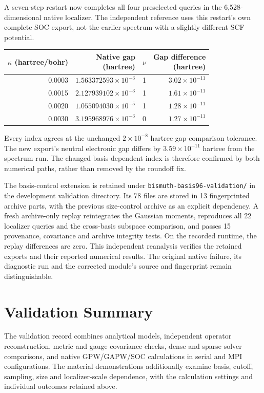 \documentclass[11pt]{article}
\begin{document}
A seven-step restart now completes all four preselected queries
in the 6,528-dimensional native localizer. The independent
reference uses this restart's own complete SOC export, not the
earlier spectrum with a slightly different SCF potential.
\begin{center}
\begin{tabular}{rrrr}
\hline
\shortstack{$\kappa$\\(hartree/bohr)} &
\shortstack{Native gap\\(hartree)} & $\nu$ &
\shortstack{Gap difference\\(hartree)}\\
\hline
0.0003 & $1.563372593\times10^{-3}$ & 1 & $3.02\times10^{-11}$\\
0.0015 & $2.127939102\times10^{-3}$ & 1 & $1.61\times10^{-11}$\\
0.0020 & $1.055094030\times10^{-5}$ & 1 & $1.28\times10^{-11}$\\
0.0030 & $3.195968976\times10^{-3}$ & 0 & $1.27\times10^{-11}$\\
\hline
\end{tabular}
\end{center}
Every index agrees at the unchanged $2\times10^{-8}$ hartree
gap-comparison tolerance. The new export's neutral electronic
gap differs by $3.59\times10^{-11}$ hartree from the spectrum
run. The changed basis-dependent index is therefore confirmed
by both numerical paths, rather than removed by the roundoff fix.

The basis-control extension is retained under
\nolinkurl{bismuth-basis96-validation/} in the development
validation directory.
Its 78 files are stored in 13 fingerprinted archive parts, with
the previous size-control archive as an explicit dependency.
A fresh archive-only replay reintegrates the Gaussian moments,
reproduces all 22 localizer queries and the cross-basis subspace
comparison, and passes 15 provenance, covariance and archive
integrity tests. On the recorded runtime, the replay differences
are zero. This independent reanalysis verifies the retained exports
and their reported numerical results. The original native
failure, its diagnostic run and the corrected module's source
and fingerprint remain distinguishable.

\clearpage
\section{Validation Summary}
The validation record combines analytical models, independent operator
reconstruction, metric and gauge covariance checks, dense and sparse
solver comparisons, and native GPW/GAPW/SOC calculations in serial and
MPI configurations. The material demonstrations additionally examine
basis, cutoff, sampling, size and localizer-scale dependence, with
the calculation settings and individual outcomes retained above.
\end{document}

